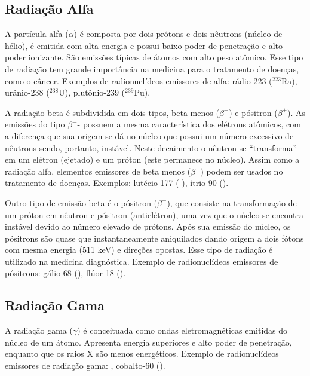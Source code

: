 \documentclass[11pt]{article}
\begin{document}
\begin{multicols}{2}
\subsection{Radiação Alfa}
\label{sec:org18a4331}

A partícula alfa (\(\alpha\)) é composta por dois prótons e dois nêutrons (núcleo de hélio), é emitida com alta energia e possui baixo poder de penetração e alto poder ionizante. São emissões típicas de átomos com alto peso atômico. Esse tipo de radiação tem grande importância na medicina para o tratamento de doenças, como o câncer. Exemplos de radionuclídeos emissores de alfa: rádio-223 (\(^{223}\)Ra), urânio-238 (\(^{238}\)U), plutônio-239 (\(^{239}\)Pu).

A radiação beta é subdividida em dois tipos, beta menos (\(\beta ^-\)) e pósitron (\(\beta ^+\)). As emissões do tipo \(\beta ^-\)- possuem a mesma característica dos elétrons atômicos, com a diferença que sua origem se dá no núcleo que possui um número excessivo de nêutrons sendo, portanto, instável. Neste decaimento o nêutron se “transforma” em um elétron (ejetado) e um próton (este permanece no núcleo). Assim como a  radiação  alfa,  elementos  emissores  de  beta  menos  (\(\beta ^-\))  podem  ser  usados  no  tratamento de doenças. Exemplos: lutécio-177 ( ),  ítrio-90 ().

Outro tipo de emissão beta é o pósitron (\(\beta ^+\)), que consiste na transformação de  um  próton  em  nêutron  e  pósitron  (antielétron),  uma  vez  que  o  núcleo  se  encontra  instável  devido  ao  número  elevado  de  prótons.  Após  sua  emissão  do  núcleo, os pósitrons são quase que instantaneamente aniquilados dando origem a dois fótons com mesma energia (511 keV) e direções opostas. Esse tipo de radiação é utilizado na medicina diagnóstica. Exemplo de radionuclídeos emissores de pósitrons: gálio-68  (), flúor-18 ().


\subsection{Radiação Gama}
\label{sec:org79f611d}

A radiação gama (\(\gamma\)) é conceituada como ondas eletromagnéticas emitidas do núcleo de um átomo. Apresenta energia superiores e alto poder de penetração, enquanto que os raios X são menos energéticos. Exemplo de radionuclídeos emissores de radiação gama:  , cobalto-60 ().



\end{multicols}
\end{document}
